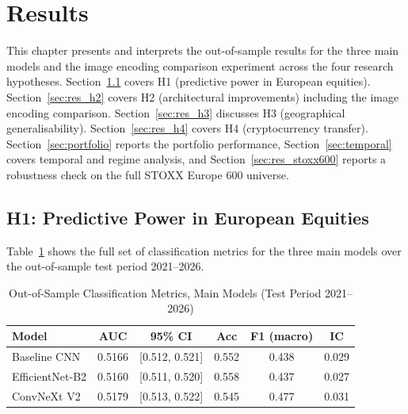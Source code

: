
\newpage
\section{Results}

This chapter presents and interprets the out-of-sample results for the three main models and the image encoding comparison experiment across the four research hypotheses. Section~\ref{sec:res_h1} covers H1 (predictive power in European equities). Section~\ref{sec:res_h2} covers H2 (architectural improvements) including the image encoding comparison. Section~\ref{sec:res_h3} discusses H3 (geographical generalisability). Section~\ref{sec:res_h4} covers H4 (cryptocurrency transfer). Section~\ref{sec:portfolio} reports the portfolio performance, Section~\ref{sec:temporal} covers temporal and regime analysis, and Section~\ref{sec:res_stoxx600} reports a robustness check on the full STOXX Europe 600 universe.

\subsection{H1: Predictive Power in European Equities}
\label{sec:res_h1}

Table~\ref{tab:main_metrics} shows the full set of classification metrics for the three main models over the out-of-sample test period 2021--2026.

\begin{table}[H]
\centering
\caption{Out-of-Sample Classification Metrics, Main Models (Test Period 2021--2026)}
\label{tab:main_metrics}
\small
\begin{tabular}{lccccc}
\toprule
\textbf{Model} & \textbf{AUC} & \textbf{95\% CI} & \textbf{Acc} & \textbf{F1 (macro)} & \textbf{IC} \\
\midrule
Baseline CNN   & 0.5166 & [0.512, 0.521] & 0.552 & 0.438 & 0.029 \\
EfficientNet-B2 & 0.5160 & [0.511, 0.520] & 0.558 & 0.437 & 0.027 \\
ConvNeXt V2    & 0.5179 & [0.513, 0.522] & 0.545 & 0.477 & 0.031 \\
\bottomrule
\end{tabular}
\end{table}

